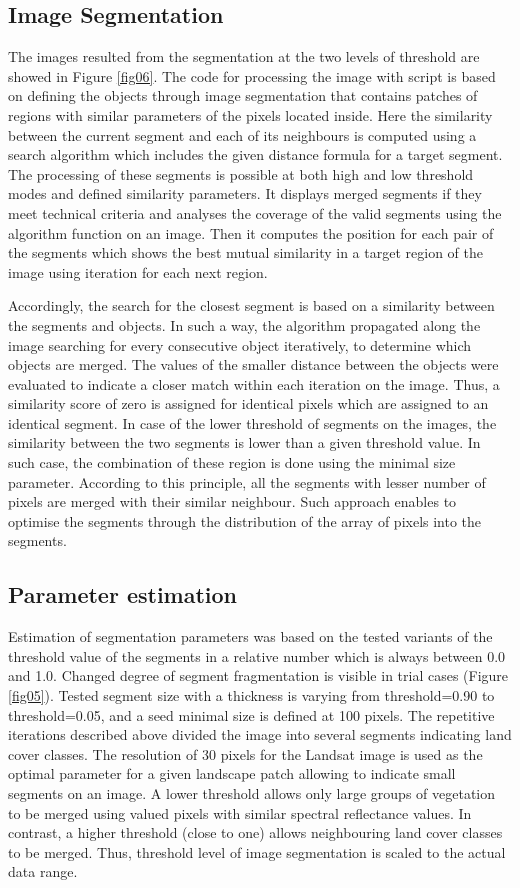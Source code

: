 \documentclass[analytics,article,submit,pdftex,moreauthors]{Definitions/mdpi}
\begin{document}
\subsection{Image Segmentation}
The images resulted from the segmentation at the two levels of threshold are showed in Figure \ref{fig06}. The code for processing the image with script is based on defining the objects through image segmentation that contains patches of regions with similar parameters of the pixels located inside. Here the similarity between the current segment and each of its neighbours is computed using a search algorithm which includes the given distance formula for a target segment. The processing of these segments is possible at both high and low threshold modes and defined similarity parameters. It displays merged segments if they meet technical criteria and analyses the coverage of the valid segments using the algorithm function on an image. Then it computes the position for each pair of the segments which shows the best mutual similarity in a target region of the image using iteration for each next region. 

Accordingly, the search for the closest segment is based on a similarity between the segments and objects. In such a way, the algorithm propagated along the image searching for every consecutive object iteratively, to determine which objects are merged. The values of the smaller distance between the objects were evaluated to indicate a closer match within each iteration on the image. Thus, a similarity score of zero is assigned for identical pixels which are assigned to an identical segment. In case of the lower threshold of segments on the images, the similarity between the two segments is lower than a given threshold value. In such case, the combination of these region is done using the minimal size parameter. According to this principle, all the segments with lesser number of pixels are merged with their similar neighbour. Such approach enables to optimise the segments through the distribution of the array of pixels into the segments.

\subsection{Parameter estimation}

Estimation of segmentation parameters was based on the tested variants of the threshold value of the segments in a relative number which is always between 0.0 and 1.0. Changed degree of segment fragmentation is visible in trial cases (Figure \ref{fig05}). Tested segment size with a thickness is varying from threshold=0.90 to threshold=0.05, and a seed minimal size is defined at 100 pixels. The repetitive iterations described above divided the image into several segments indicating land cover classes. The resolution of 30 pixels for the Landsat image is used as the optimal parameter for a given landscape patch allowing to indicate small segments on an image. A lower threshold allows only large groups of vegetation to be merged using valued pixels with similar spectral reflectance values. In contrast, a higher threshold (close to one) allows neighbouring land cover classes to be merged. Thus, threshold level of image segmentation is scaled to the actual data range.
\end{document}
